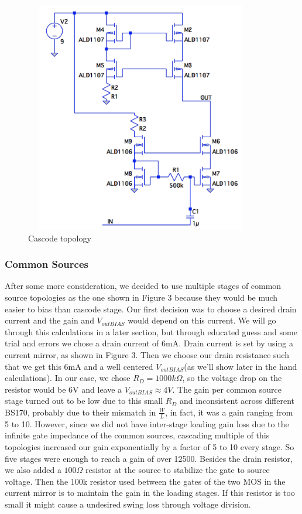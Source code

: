 \documentclass[11pt, twoside, letterpaper]{article}
\begin{document}
\begin{figure}[htbp]
\begin{center}
\includegraphics[width=4in,height=4in]{Cascode.png}
\caption{Cascode topology}
\end{center}
\end{figure}
\FloatBarrier

\subsubsection{Common Sources}
After some more consideration, we decided to use multiple stages of common source topologies as the one shown in Figure 3 because they would 
be much easier to bias than cascode stage. Our first decision was to choose a desired drain current and the gain and $V_{outBIAS}$
would depend on this current. We will go through this calculations in a later section, but through educated guess and some trial and errors we 
chose a drain current of 6mA. Drain current is set by using a current mirror, as shown in Figure 3. Then we choose our drain 
resistance such that we get this 6mA and a well centered $V_{outBIAS}$(as we'll show later in the hand calculations). In our case, we chose 
$R_D=1000k\Omega$, so the voltage drop on the resistor would be 6V and leave a $V_{outBIAS}\approx 4V$. The gain per common source stage turned 
out to be low due to this small $R_D$ and inconsistent across different BS170, probably due to their mismatch in $\frac{W}{L}$, in fact, it 
was a gain ranging from 5 to 10. However, since we did not have inter-stage loading gain loss due to the infinite gate impedance of the common 
sources, cascading multiple of this topologies increased our gain exponentially by a factor of 5 to 10 every stage. So five stages were enough 
to reach a gain of over 12500. Besides the drain resistor, we also added a $100\Omega$ resistor at the source to stabilize the gate to source voltage.
Then the 100k resistor used between the gates of the two MOS in the current mirror is to maintain the gain in the loading stages. If this resistor
is too small it might cause a undesired swing loss through voltage division.
\end{document}
